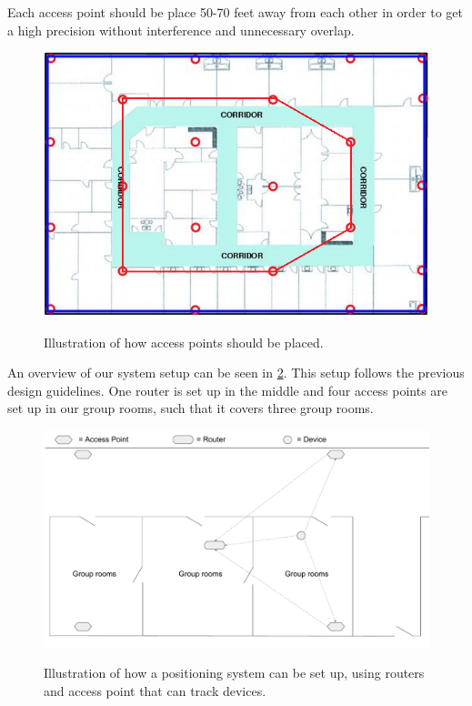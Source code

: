 Each access point should be place 50-70 feet away from each other in order to get a high precision without interference and unnecessary overlap\cite{access_point_range}.

\begin{figure}[H]
	\centering
	\includegraphics[scale=0.5]{graphics/access_placement.png}
	\label{fig:access_placement}
	\caption{Illustration of how access points should be placed\cite{access_point_placement}.}
\end{figure}

An overview of our system setup can be seen in \cref{fig:OwnSetup}. This setup follows the previous design guidelines. One router is set up in the middle and four access points are set up in our group rooms, such that it covers three group rooms.

\begin{figure}[H]
	\centering
	\includegraphics[scale=0.5]{graphics/Router-AccessPoint_Setup.pdf}
	\label{fig:OwnSetup}
	\caption{Illustration of how a positioning system can be set up, using routers and access point that can track devices.}
\end{figure}


